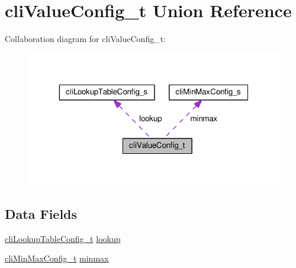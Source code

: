 \hypertarget{unioncliValueConfig__t}{\section{cli\+Value\+Config\+\_\+t Union Reference}
\label{unioncliValueConfig__t}
}


Collaboration diagram for cli\+Value\+Config\+\_\+t\+:\nopagebreak
\begin{figure}[H]
\begin{center}
\leavevmode
\includegraphics[width=319pt]{unioncliValueConfig__t__coll__graph}
\end{center}
\end{figure}
\subsection*{Data Fields}
\begin{DoxyCompactItemize}
\item 
\hyperlink{group__cli_ga93a3507442ae4a3fde4dd71ae572e688}{cli\+Lookup\+Table\+Config\+\_\+t} \hyperlink{unioncliValueConfig__t_af86ae6a10d239cedd65bcb4a55e3bc4e}{lookup}
\item 
\hyperlink{group__cli_gab55b8935b3c256b897d3bad997cdbd9b}{cli\+Min\+Max\+Config\+\_\+t} \hyperlink{unioncliValueConfig__t_a8326730c4b8948749e09b100a7054a6d}{minmax}
\end{DoxyCompactItemize}


